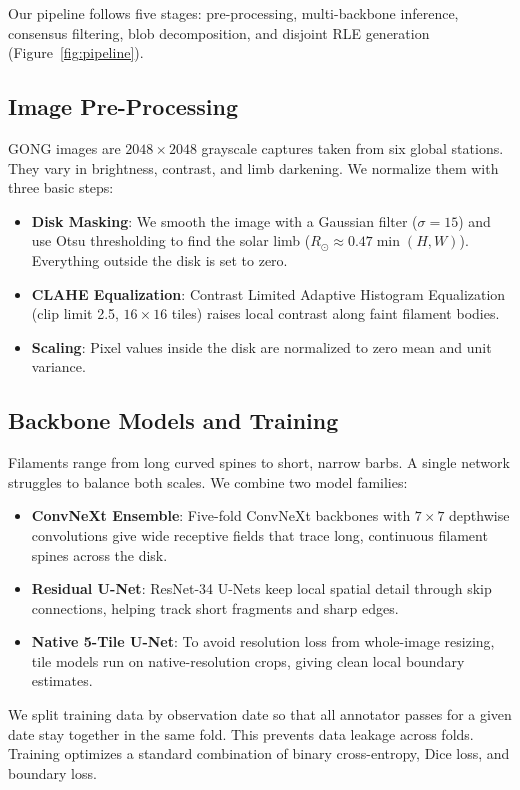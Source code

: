 \documentclass[sigconf]{acmart}
\begin{document}
Our pipeline follows five stages: pre-processing, multi-backbone inference, consensus filtering, blob decomposition, and disjoint RLE generation (Figure~\ref{fig:pipeline}).

\subsection{Image Pre-Processing}
GONG images are $2048 \times 2048$ grayscale captures taken from six global stations. They vary in brightness, contrast, and limb darkening. We normalize them with three basic steps:
\begin{itemize}
    \item \textbf{Disk Masking}: We smooth the image with a Gaussian filter ($\sigma = 15$) and use Otsu thresholding to find the solar limb ($R_{\odot} \approx 0.47 \min(H, W)$). Everything outside the disk is set to zero.
    \item \textbf{CLAHE Equalization}: Contrast Limited Adaptive Histogram Equalization (clip limit 2.5, $16 \times 16$ tiles) raises local contrast along faint filament bodies.
    \item \textbf{Scaling}: Pixel values inside the disk are normalized to zero mean and unit variance.
\end{itemize}

\subsection{Backbone Models and Training}
Filaments range from long curved spines to short, narrow barbs. A single network struggles to balance both scales. We combine two model families:
\begin{itemize}
    \item \textbf{ConvNeXt Ensemble}: Five-fold ConvNeXt backbones \cite{liu2022convnet} with $7 \times 7$ depthwise convolutions give wide receptive fields that trace long, continuous filament spines across the disk.
    \item \textbf{Residual U-Net}: ResNet-34 U-Nets \cite{he2016deep, ronneberger2015u} keep local spatial detail through skip connections, helping track short fragments and sharp edges.
    \item \textbf{Native 5-Tile U-Net}: To avoid resolution loss from whole-image resizing, tile models run on native-resolution crops, giving clean local boundary estimates.
\end{itemize}

We split training data by observation date so that all annotator passes for a given date stay together in the same fold. This prevents data leakage across folds. Training optimizes a standard combination of binary cross-entropy, Dice loss, and boundary loss.
\end{document}
